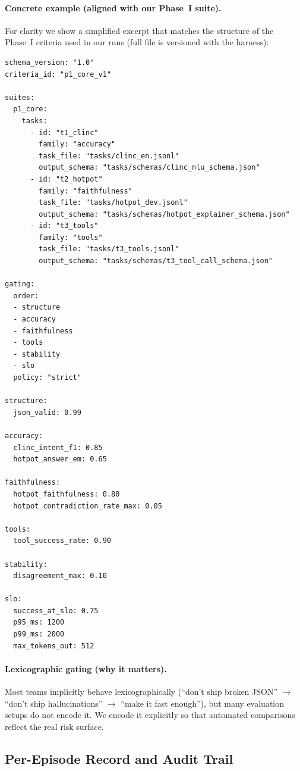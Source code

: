 \documentclass[11pt]{article}
\begin{document}
\paragraph{Concrete example (aligned with our Phase~I suite).}
For clarity we show a simplified excerpt that matches the structure of the Phase~I criteria used in our runs (full file is versioned with the harness):

\begin{lstlisting}[basicstyle=\ttfamily\small]
schema_version: "1.0"
criteria_id: "p1_core_v1"

suites:
  p1_core:
    tasks:
      - id: "t1_clinc"
        family: "accuracy"
        task_file: "tasks/clinc_en.jsonl"
        output_schema: "tasks/schemas/clinc_nlu_schema.json"
      - id: "t2_hotpot"
        family: "faithfulness"
        task_file: "tasks/hotpot_dev.jsonl"
        output_schema: "tasks/schemas/hotpot_explainer_schema.json"
      - id: "t3_tools"
        family: "tools"
        task_file: "tasks/t3_tools.jsonl"
        output_schema: "tasks/schemas/t3_tool_call_schema.json"

gating:
  order:
  - structure
  - accuracy
  - faithfulness
  - tools
  - stability
  - slo
  policy: "strict"

structure:
  json_valid: 0.99

accuracy:
  clinc_intent_f1: 0.85
  hotpot_answer_em: 0.65

faithfulness:
  hotpot_faithfulness: 0.80
  hotpot_contradiction_rate_max: 0.05

tools:
  tool_success_rate: 0.90

stability:
  disagreement_max: 0.10

slo:
  success_at_slo: 0.75
  p95_ms: 1200
  p99_ms: 2000
  max_tokens_out: 512
\end{lstlisting}

\paragraph{Lexicographic gating (why it matters).}
Most teams implicitly behave lexicographically (``don’t ship broken JSON'' $\rightarrow$ ``don’t ship hallucinations'' $\rightarrow$ ``make it fast enough''), but many evaluation setups do not encode it.
We encode it explicitly so that automated comparisons reflect the real risk surface.

\subsection{Per-Episode Record and Audit Trail}
\label{sec:episode-record}
\end{document}
